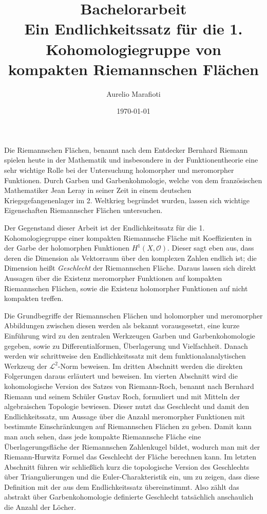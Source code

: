 \documentclass[11pt,a4paper,toc=bibliography]{scrartcl}
\title{{\Huge Bachelorarbeit} \\[18pt] Ein Endlichkeitssatz für die 1. Kohomologiegruppe von kompakten Riemannschen Flächen \\[18pt]}
\author{Aurelio Marafioti}
\date{\today}
\theoremstyle{def}
\theoremstyle{thm}
\theoremstyle{remark}
\begin{document}




\thispagestyle{empty}

\newpage

\tableofcontents

\thispagestyle{empty}


\newpage

\setcounter{page}{3}
Die Riemannschen Flächen, benannt nach dem Entdecker Bernhard Riemann spielen heute in der Mathematik und insbesondere in der Funktionentheorie eine sehr wichtige Rolle bei der Untersuchung holomorpher und meromorpher Funktionen. Durch Garben und Garbenkohmologie, welche von dem französischen Mathematiker Jean Leray in seiner Zeit in einem deutschen Kriegsgefangenenlager im 2. Weltkrieg begründet wurden, lassen sich wichtige Eigenschaften Riemannscher Flächen untersuchen.

Der Gegenstand dieser Arbeit ist der Endlichkeitssatz für die 1. Kohomologiegruppe einer kompakten Riemannsche Fläche mit Koeffizienten in der Garbe der holomorphen Funktionen $H^1(X,\mathcal{O})$. Dieser sagt eben aus, dass deren die Dimension als Vektorraum über den komplexen Zahlen endlich ist; die Dimension heißt \emph{Geschlecht} der Riemannschen Fläche. Daraus lassen sich direkt Aussagen über die Existenz meromorpher Funktionen auf kompakten Riemannschen Flächen, sowie die Existenz holomorpher Funktionen auf nicht kompakten treffen.

Die Grundbegriffe der Riemannschen Flächen und holomorpher und meromorpher Abbildungen zwischen diesen werden als bekannt vorausgesetzt, eine kurze Einführung wird zu den zentralen Werkzeugen Garben und Garbenkohomologie gegeben, sowie zu Differentialformen, Überlagerung und Vielfachheit. Danach werden wir schrittweise den Endlichkeitssatz mit dem funktionalanalytischen Werkzeug der $\mathcal{L}^2$-Norm beweisen. Im dritten Abschnitt werden die direkten Folgerungen daraus erläutert und beweisen. Im vierten Abschnitt wird die kohomologische Version des Satzes von Riemann-Roch, benannt nach Bernhard Riemann und seinem Schüler Gustav Roch, formuliert und mit Mitteln der algebraischen Topologie bewiesen. Dieser nutzt das Geschlecht und damit den Endlichkeitssatz, um Aussage über die Anzahl meromorpher Funktionen mit bestimmte Einschränkungen auf Riemannschen Flächen zu geben. Damit kann man auch sehen, dass jede kompakte Riemannsche Fläche eine Überlagerungsfläche der Riemannschen Zahlenkugel bildet, wodurch man mit der Riemann-Hurwitz Formel das Geschlecht der Fläche berechnen kann. Im letzten Abschnitt führen wir schließlich kurz die topologische Version des Geschlechts über Triangulierungen und die Euler-Charakteristik ein, um zu zeigen, dass diese Definition mit der aus dem Endlichkeitssatz übereinstimmt. Also zählt das abstrakt über Garbenkohomologie definierte Geschlecht tatsächlich anschaulich die Anzahl der Löcher.
\end{document}
